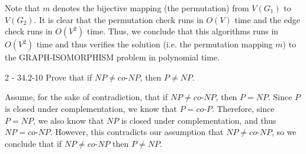 \documentclass[11pt]{article}
\begin{document}
\begin{sol}
Note that $m$ denotes the bijective mapping (the permutation) from $V(G_1)$ to $V(G_2)$. It is clear that the permutation check runs in $O(V)$ time and the edge check runs in $O(V^2)$ time. Thus, we conclude that this algorithms runs in $O(V^2)$ time and thus verifies the solution (i.e. the permutation mapping $m$) to the GRAPH-ISOMORPHISM problem in polynomial time. 
\end{sol}

\begin{prob}{2 - 34.2-10}
Prove that if $NP \not= co$-$NP$, then $P \not= NP$.
\end{prob}
\begin{sol}

Assume, for the sake of contradiction, that if $NP \not= co$-$NP$, then $P = NP$. Since $P$ is closed under complementation, we know that $P = co$-$P$. Therefore, since $P = NP$, we also know that $NP$ is closed under complementation, and thus $NP = co$-$NP$. However, this contradicts our assumption that $NP \not= co$-$NP$, so we conclude that if $NP \not= co$-$NP$ then $P \not= NP$.
\end{sol}
\end{document}
